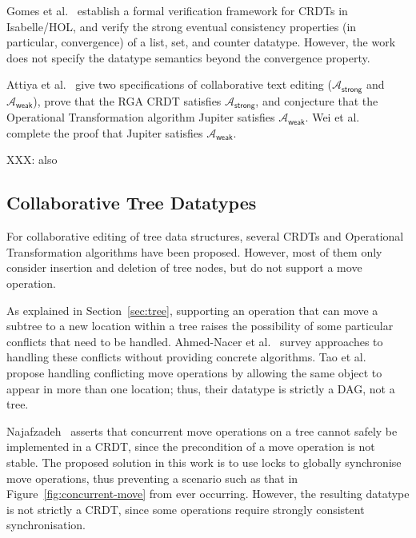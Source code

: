 Gomes et al.~\cite{Gomes:2017gy} establish a formal verification framework for CRDTs in Isabelle/HOL, and verify the strong eventual consistency properties (in particular, convergence) of a list, set, and counter datatype.
However, the work does not specify the datatype semantics beyond the convergence property.

Attiya et al.~\cite{Attiya:2016kh} give two specifications of collaborative text editing ($\mathcal{A}_\textsf{strong}$ and $\mathcal{A}_\textsf{weak}$), prove that the RGA CRDT \cite{Roh:2011dw} satisfies $\mathcal{A}_\textsf{strong}$, and conjecture that the Operational Transformation algorithm Jupiter \cite{Nichols:1995fd} satisfies $\mathcal{A}_\textsf{weak}$.
Wei et al.~\cite{Wei:2017tg} complete the proof that Jupiter satisfies $\mathcal{A}_\textsf{weak}$.

XXX: also~\cite{DBLP:conf/popl/BurckhardtGYZ14, DBLP:conf/atva/MukundRS15, DBLP:conf/coordination/GadducciMR17, DBLP:conf/popl/GotsmanYFNS16}

\subsection{Collaborative Tree Datatypes}

For collaborative editing of tree data structures, several CRDTs \cite{Martin:2010ih,Kleppmann:2016ve} and Operational Transformation algorithms \cite{Jungnickel:2016cb,Ignat:2003jy,Davis:2002iv} have been proposed.
However, most of them only consider insertion and deletion of tree nodes, but do not support a move operation.

As explained in Section~\ref{sec:tree}, supporting an operation that can move a subtree to a new location within a tree raises the possibility of some particular conflicts that need to be handled.
Ahmed-Nacer et al.~\cite{AhmedNacer:2012us} survey approaches to handling these conflicts without providing concrete algorithms.
Tao et al.~\cite{Tao:2015gd} propose handling conflicting move operations by allowing the same object to appear in more than one location; thus, their datatype is strictly a DAG, not a tree.

Najafzadeh~\cite{Najafzadeh:2017vk} asserts that concurrent move operations on a tree cannot safely be implemented in a CRDT, since the precondition of a move operation is not stable.
The proposed solution in this work is to use locks to globally synchronise move operations, thus preventing a scenario such as that in Figure~\ref{fig:concurrent-move} from ever occurring.
However, the resulting datatype is not strictly a CRDT, since some operations require strongly consistent synchronisation.

